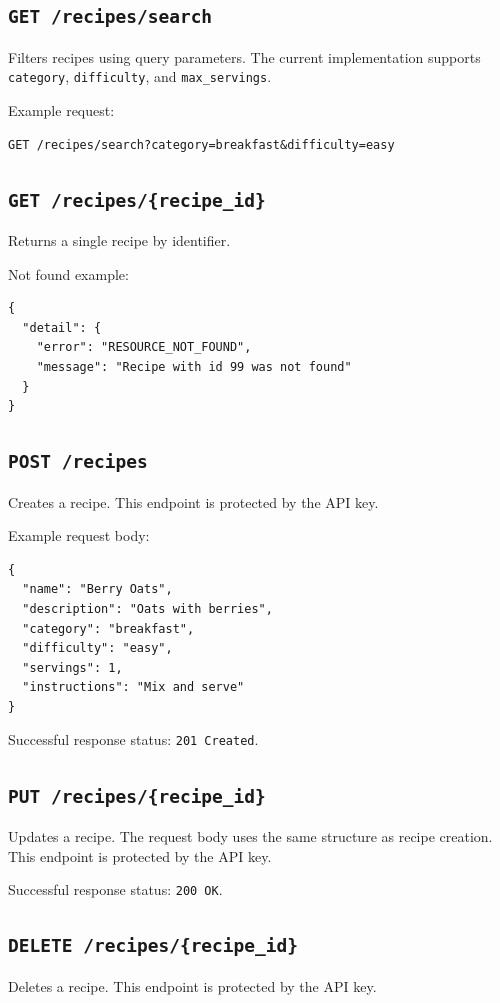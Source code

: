 \documentclass[11pt,a4paper]{article}
\begin{document}
\subsection*{\texttt{GET /recipes/search}}
Filters recipes using query parameters. The current implementation supports \texttt{category}, \texttt{difficulty}, and \texttt{max\_servings}.

Example request:
\begin{lstlisting}[style=jsonstyle]
GET /recipes/search?category=breakfast&difficulty=easy
\end{lstlisting}

\subsection*{\texttt{GET /recipes/\{recipe\_id\}}}
Returns a single recipe by identifier.

Not found example:
\begin{lstlisting}[style=jsonstyle]
{
  "detail": {
    "error": "RESOURCE_NOT_FOUND",
    "message": "Recipe with id 99 was not found"
  }
}
\end{lstlisting}

\subsection*{\texttt{POST /recipes}}
Creates a recipe. This endpoint is protected by the API key.

Example request body:
\begin{lstlisting}[style=jsonstyle]
{
  "name": "Berry Oats",
  "description": "Oats with berries",
  "category": "breakfast",
  "difficulty": "easy",
  "servings": 1,
  "instructions": "Mix and serve"
}
\end{lstlisting}

Successful response status: \texttt{201 Created}.

\subsection*{\texttt{PUT /recipes/\{recipe\_id\}}}
Updates a recipe. The request body uses the same structure as recipe creation. This endpoint is protected by the API key.

Successful response status: \texttt{200 OK}.

\subsection*{\texttt{DELETE /recipes/\{recipe\_id\}}}
Deletes a recipe. This endpoint is protected by the API key.
\end{document}
